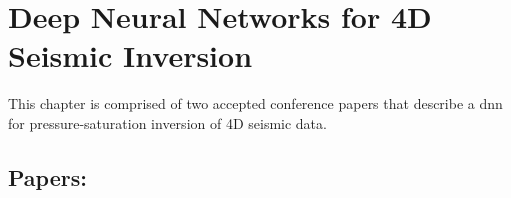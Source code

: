 \chapter{Deep Neural Networks for 4D Seismic Inversion}
\label{sec:inversion}

This chapter is comprised of two accepted conference papers that describe a \acl{dnn} for pressure-saturation inversion of 4D seismic data.

\vfill
\section*{Papers:}
 \\[1cm]
\vfill






\appendix






\backmatter

\clearforchapter
\newrefcontext[sorting=nyt]
\printbibliography


